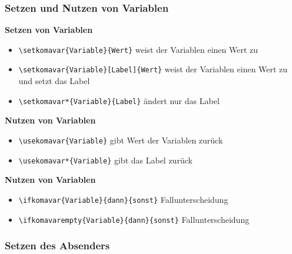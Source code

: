 \documentclass[12pt,ngerman]{beamer}
\begin{document}
\begin{frame}[containsverbatim]
\frametitle{Setzen und Nutzen von Variablen}

\textbf{Setzen von Variablen}

\begin{itemize}
	\item \lstinline|\setkomavar{Variable}{Wert}| weist der Variablen einen Wert zu
	\item \lstinline|\setkomavar{Variable}[Label]{Wert}| weist der Variablen einen Wert zu und setzt das Label
	\item \lstinline|\setkomavar*{Variable}{Label}| ändert nur das Label
\end{itemize}

\textbf{Nutzen von Variablen}

\begin{itemize}
	\item \lstinline|\usekomavar{Variable}| gibt Wert der Variablen zurück
	\item \lstinline|\usekomavar*{Variable}| gibt das Label zurück
\end{itemize}

\textbf{Nutzen von Variablen}

\begin{itemize}
	\item \lstinline|\ifkomavar{Variable}{dann}{sonst}| Fallunterscheidung
	\item \lstinline|\ifkomavarempty{Variable}{dann}{sonst}|  Fallunterscheidung
\end{itemize}


\end{frame}

\begin{frame}[fragile]
\frametitle{Setzen des Absenders}



\end{frame}
\end{document}
